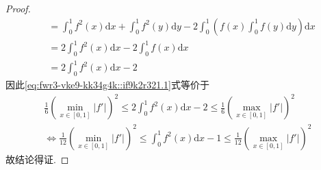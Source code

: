 \documentclass[../../main.tex]{subfiles}%
\begin{document}
\begin{proof}
\begin{align*}
&= \int_0^1 f^2(x) \mathrm{d}x + \int_0^1 f^2(y) \mathrm{d}y - 2 \int_0^1 \left( f(x) \int_0^1 f(y) \mathrm{d}y \right) \mathrm{d}x \\
&= 2 \int_0^1 f^2(x) \mathrm{d}x - 2 \int_0^1 f(x) \mathrm{d}x \\
&= 2 \int_0^1 f^2(x) \mathrm{d}x - 2
\end{align*}
因此\eqref{eq:fwr3-vke9-kk34g4k::if9k2r321.1}式等价于
\begin{align*}
\frac{1}{6} \left( \min\limits_{x\in[0,1]} |f'| \right)^2 \leqslant 2 \int_0^1 f^2(x) \mathrm{d}x - 2 \leqslant \frac{1}{6} \left( \max\limits_{x\in[0,1]} |f'| \right)^2 \\
\Longleftrightarrow \frac{1}{12} \left( \min\limits_{x\in[0,1]} |f'| \right)^2 \leqslant \int_0^1 f^2(x) \mathrm{d}x - 1 \leqslant \frac{1}{12} \left( \max\limits_{x\in[0,1]} |f'| \right)^2
\end{align*}
故结论得证.

\end{proof}
\end{document}
